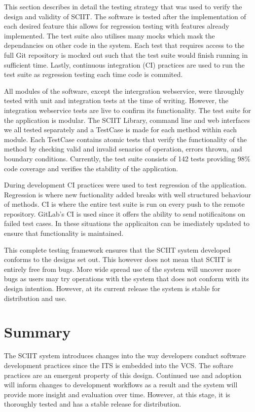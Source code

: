 \documentclass{mproj}
\begin{document}
This section describes in detail the testing strategy that was used to verify the design and validity of SCIIT. The software is tested after the implementation of each desired feature this allows for regression testing with features already implemented. The test suite also utilises many mocks which mask the dependancies on other code in the system. Each test that requires access to the full Git repository is mocked out such that the test suite would finish running in sufficient time. Lastly, continuous integration (CI) practices are used to run the test suite as regression testing each time code is commited.

All modules of the software, except the intergration webservice, were throughly tested with unit and integration tests at the time of writing. However, the integration webservice tests are live to confirm its functionality. The test suite for the application is modular. The SCIIT Library, command line and web interfaces we all tested separately and a TestCase is made for each method within each module. Each TestCase contains atomic tests that verify the functionality of the method by checking valid and invalid senarios of operation, errors thrown, and boundary conditions. Currently, the test suite consists of 142 tests providing 98\% code coverage and verifies the stability of the application. 

During development CI practices were used to test regression of the application. Regression is where new fuctionality added breaks with well structured behaviour of methods. CI is where the entire test suite is run on every push to the remote repository. GitLab's CI is used since it offers the ability to send notificaitons on failed test cases. In these situations the applicaiton can be imediately updated to ensure that functionality is maintained.

This complete testing framework ensures that the SCIIT system developed conforms to the designs set out. This however does not mean that SCIIT is entirely free from bugs. More wide spread use of the system will uncover more bugs as users may try operations with the system that does not conform with its design intention. However, at its current release the system is stable for distribution and use.


\section{Summary}

The SCIIT system introduces changes into the way developers conduct software development practices since the ITS is embedded into the VCS. The softare practices are an emergent property of this design. Continued use and adoption will inform changes to development workflows as a result and the system will provide more insight and evaluation over time. However, at this stage, it is thoroughly tested and has a stable release for distribution.
\end{document}
